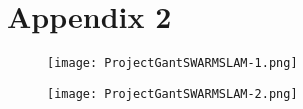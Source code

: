 \documentclass[12pt]{report} %
\begin{document}
\chapter{Appendix 2}
\begin{figure}[H]
\centering
\texttt{[image: ProjectGantSWARMSLAM-1.png]}
\end{figure}
\begin{figure}[H]
\centering
\texttt{[image: ProjectGantSWARMSLAM-2.png]}
\end{figure}
%


\nocite{*}




\end{document}
